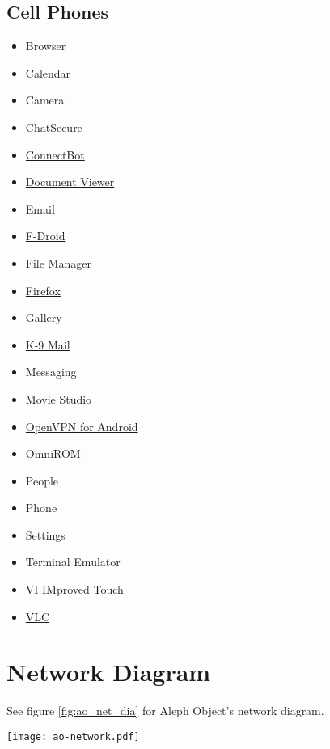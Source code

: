 \subsection{Cell Phones}
\begin{itemize}
\item Browser
\item Calendar
\item Camera
\item \href{https://chatsecure.org/}{ChatSecure}
\item \href{http://code.google.com/p/connectbot/}{ConnectBot}
\item \href{https://github.com/dschuermann/document-viewer}{Document Viewer}
\item Email
\item \href{https://f-droid.org/}{F-Droid}
\item File Manager
\item \href{http://www.mozilla.org/en-US/firefox/}{Firefox}
\item Gallery
\item \href{http://code.google.com/p/k9mail/}{K-9 Mail}
\item Messaging
\item Movie Studio
\item \href{https://code.google.com/p/ics-openvpn/}{OpenVPN for Android}
\item \href{https://omnirom.org/}{OmniROM}
\item People
\item Phone
\item Settings
\item Terminal Emulator
\item \href{https://github.com/momodalo/vimtouch}{VI IMproved Touch}
\item \href{http://www.videolan.org/vlc/download-android.html}{VLC}
\end{itemize}

\section{Network Diagram}
See figure \ref{fig:ao_net_dia} for Aleph Object's network diagram.

\begin{sidewaysfigure}[p]
 \texttt{[image: ao-network.pdf]}
 \caption{Network Diagram}
 \label{fig:ao_net_dia}
\end{sidewaysfigure}
